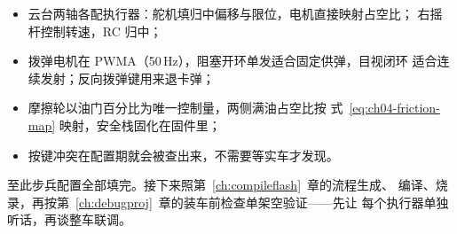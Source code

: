\begin{itemize}
  \item 云台两轴各配执行器：舵机填归中偏移与限位，电机直接映射占空比；
        右摇杆控制转速，RC 归中；
  \item 拨弹电机在 PWMA（50\,Hz），阻塞开环单发适合固定供弹，目视闭环
        适合连续发射；反向拨弹键用来退卡弹；
  \item 摩擦轮以油门百分比为唯一控制量，两侧满油占空比按
        式~\eqref{eq:ch04-friction-map} 映射，安全栈固化在固件里；
  \item 按键冲突在配置期就会被查出来，不需要等实车才发现。
\end{itemize}

至此步兵配置全部填完。接下来照第~\ref{ch:compileflash}~章的流程生成、
编译、烧录，再按第~\ref{ch:debugproj}~章的装车前检查单架空验证——先让
每个执行器单独听话，再谈整车联调。
